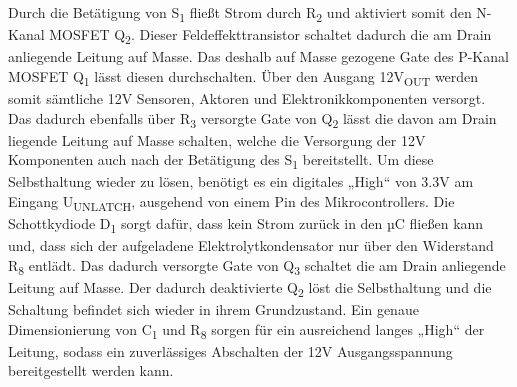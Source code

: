 Durch die Betätigung von S\textsubscript{1} fließt Strom durch R\textsubscript{2} und aktiviert somit den N-Kanal MOSFET Q\textsubscript{2}.
Dieser Feldeffekttransistor schaltet dadurch die am Drain anliegende Leitung auf Masse.
Das deshalb auf Masse gezogene Gate des P-Kanal MOSFET Q\textsubscript{1} lässt diesen durchschalten.
Über den Ausgang 12V\textsubscript{OUT} werden somit sämtliche 12V Sensoren, Aktoren und Elektronikkomponenten versorgt.
Das dadurch ebenfalls über R\textsubscript{3} versorgte Gate von Q\textsubscript{2} lässt die davon am Drain liegende Leitung auf Masse schalten,
welche die Versorgung der 12V Komponenten auch nach der Betätigung des S\textsubscript{1} bereitstellt.
Um diese Selbsthaltung wieder zu lösen, benötigt es ein digitales „High“ von 3.3V am Eingang U\textsubscript{UNLATCH}, ausgehend von einem Pin des Mikrocontrollers.
Die Schottkydiode D\textsubscript{1} sorgt dafür, dass kein Strom zurück in den µC fließen kann und,
dass sich der aufgeladene Elektrolytkondensator nur über den Widerstand R\textsubscript{8} entlädt.
Das dadurch versorgte Gate von Q\textsubscript{3} schaltet die am Drain anliegende Leitung auf Masse.
Der dadurch deaktivierte Q\textsubscript{2} löst die Selbsthaltung und die Schaltung befindet sich wieder in ihrem Grundzustand.
Ein genaue Dimensionierung von C\textsubscript{1} und R\textsubscript{8} sorgen für ein ausreichend langes „High“ der Leitung,
sodass ein zuverlässiges Abschalten der 12V Ausgangsspannung bereitgestellt werden kann. \\

